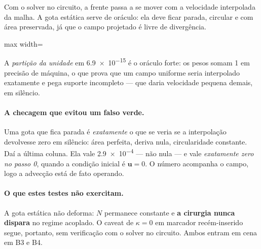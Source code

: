 Com o solver no circuito, a frente passa a se mover com a velocidade
interpolada da malha. A gota est\'atica serve de or\'aculo: ela deve ficar parada,
circular e com \'area preservada, j\'a que o campo projetado \'e livre de
diverg\^encia.

\begin{adjustbox}{max width=\linewidth}
\end{adjustbox}

A \emph{parti\c{c}\~ao da unidade} em \num{6.9e-15} \'e o or\'aculo forte: os
pesos somam 1 em precis\~ao de m\'aquina, o que prova que um campo uniforme seria
interpolado exatamente e pega suporte incompleto --- que daria velocidade pequena
demais, em sil\^encio.

\paragraph{A checagem que evitou um falso verde.} Uma gota que fica parada \'e
\emph{exatamente} o que se veria se a interpola\c{c}\~ao devolvesse zero em
sil\^encio: \'area perfeita, deriva nula, circularidade constante. Da\'i a
\'ultima coluna. Ela vale \num{2.9e-4} --- n\~ao nula --- e vale
\emph{exatamente zero no passo 0}, quando a condi\c{c}\~ao inicial \'e
$\mathbf{u}=0$. O n\'umero acompanha o campo, logo a advec\c{c}\~ao est\'a de
fato operando.

\paragraph{O que estes testes n\~ao exercitam.} A gota est\'atica n\~ao deforma:
$N$ permanece constante e \textbf{a cirurgia nunca dispara} no regime acoplado.
O caveat de $\kappa=0$ em marcador rec\'em-inserido segue, portanto, sem
verifica\c{c}\~ao com o solver no circuito. Ambos entram em cena em B3 e B4.
